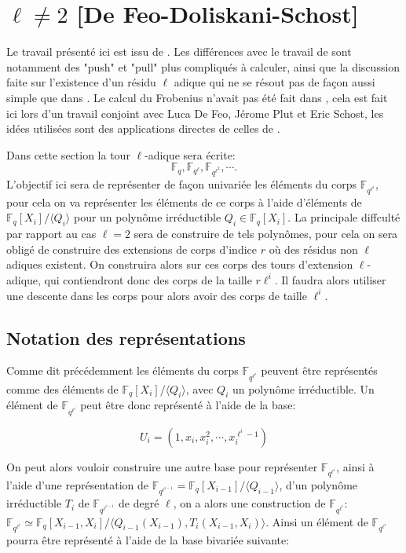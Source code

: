 \documentclass[10pt,a4paper]{book}
\theoremstyle{plain}
\theoremstyle{definition}
\theoremstyle{definition}
\theoremstyle{definition}
\theoremstyle{definition}
\theoremstyle{remark}
\theoremstyle{remark}
\begin{document}
\section{$\ell \neq 2$ [De Feo-Doliskani-Schost]}

Le travail présenté ici est issu de \cite{DeFeo-Doliskani-Schost13}. Les différences avec le travail de \cite{Doliskani-Schost15} sont notamment des "push" et "pull" plus compliqués à calculer, ainsi que la discussion faite sur l'existence d'un résidu $\ell$ adique qui ne se résout pas de façon aussi simple que dans \cite{Doliskani-Schost15}. Le calcul du Frobenius n'avait pas été fait dans \cite{DeFeo-Doliskani-Schost13}, cela est fait ici lors d'un travail conjoint avec Luca De Feo, Jérome Plut et Eric Schost, les idées utilisées sont des applications directes de celles de \cite{Doliskani-Schost15}.

Dans cette section la tour $\ell$-adique sera écrite:
\[
\mathbb{F}_q, \mathbb{F}_{q^\ell}, \mathbb{F}_{q^{\ell^2}}, \cdots.
\]
L'objectif ici sera de représenter de façon univariée les éléments du corps $\mathbb{F}_{q^{\ell^i}}$, pour cela on va représenter les éléments de ce corps à l'aide d'éléments de $\mathbb{F}_{q}[X_i]/\langle Q_i \rangle$ pour un polynôme irréductible $Q_i \in \mathbb{F}_q[X_i]$. La principale diffculté par rapport au cas $\ell=2$ sera de construire de tels polynômes, pour cela on sera obligé de construire des extensions de corps d'indice $r$ où des résidus non $\ell$ adiques existent. On construira alors sur ces corps des tours d'extension $\ell$-adique, qui contiendront donc des corps de la taille $r\ell^i$. Il faudra alors utiliser une descente dans les corps pour alors avoir des corps de taille $\ell^i$.

\subsection{Notation des représentations}
Comme dit précédemment les éléments du corps $\mathbb{F}_{q^{\ell^i}}$ peuvent être représentés comme des éléments de $\mathbb{F}_q[X_i]/\langle Q_i \rangle $, avec $Q_i$ un polynôme irréductible. Un élément de $\mathbb{F}_{q^{\ell^i}}$ peut être donc représenté à l'aide de la base:

\[
U_i=(1,x_i,x_i^2,\cdots,x_i^{\ell^i-1})
\]

On peut alors vouloir construire une autre base pour représenter $\mathbb{F}_{q^{\ell^i}}$, ainsi à l'aide d'une représentation de $\mathbb{F}_{q^{\ell^{i-1}}}=\mathbb{F}_q[X_{i-1}]/\langle Q_{i-1} \rangle $, d'un polynôme irréductible $T_{i}$ de $\mathbb{F}_{q^{\ell^{i-1}}}$ de degré $\ell$, on a alors une construction de $\mathbb{F}_{q^{\ell^i}}$: $\mathbb{F}_{q^{\ell^{i}}}\simeq \mathbb{F}_q[X_{i-1},X_{i}]/\langle Q_{i-1}(X_{i-1}), T_i(X_{i-1},X_{i}) \rangle $. Ainsi un élément de $\mathbb{F}_{q^{\ell^{i}}}$ pourra être représenté à l'aide de la base bivariée suivante:
\end{document}
